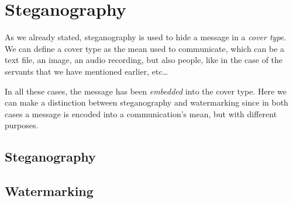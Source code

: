 \documentclass[../../main.tex]{subfiles}
\begin{document}
\section{Steganography}

As we already stated, steganography is used to hide a message in a
\emph{cover type}. We can define a cover type as the mean used to communicate,
which can be a text file, an image, an audio recording, but also people, like in
the case of the servants that we have mentioned earlier, etc\dots

In all these cases, the message has been \emph{embedded} into the cover type.
Here we can make a distinction between steganography and watermarking since in
both cases a message is encoded into a communication's mean, but with different
purposes.

\subsection{Steganography}

\subsection{Watermarking}

\pagebreak
\end{document}
